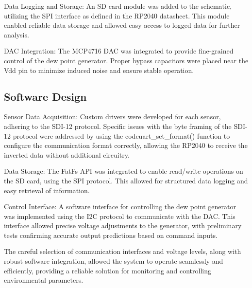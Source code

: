 Data Logging and Storage: An SD card module was added to the schematic, utilizing the SPI interface as defined in the RP2040 datasheet. This module enabled reliable data storage and allowed easy access to logged data for further analysis.

DAC Integration: The MCP4716 DAC was integrated to provide fine-grained control of the dew point generator. Proper bypass capacitors were placed near the Vdd pin to minimize induced noise and ensure stable operation.


\subsection{Software Design}
Sensor Data Acquisition: Custom drivers were developed for each sensor, adhering to the SDI-12 protocol. Specific issues with the byte framing of the SDI-12 protocol were addressed by using the code{uart_set_format()} function to configure the communication format correctly, allowing the RP2040 to receive the inverted data without additional circuitry.

Data Storage: The FatFs API was integrated to enable read/write operations on the SD card, using the SPI protocol. This allowed for structured data logging and easy retrieval of information.

Control Interface: A software interface for controlling the dew point generator was implemented using the I2C protocol to communicate with the DAC. This interface allowed precise voltage adjustments to the generator, with preliminary tests confirming accurate output predictions based on command inputs.

The careful selection of communication interfaces and voltage levels, along with robust software integration, allowed the system to operate seamlessly and efficiently, providing a reliable solution for monitoring and controlling environmental parameters.